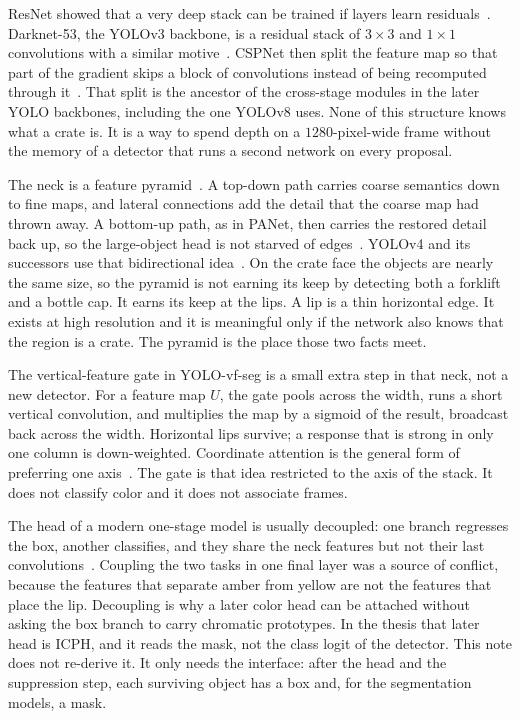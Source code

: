 \documentclass[11pt,a4paper]{article}
\begin{document}
ResNet showed that a very deep stack can be trained if layers learn residuals~\cite{he2016resnet}. Darknet-53, the YOLOv3 backbone, is a residual stack of $3\times 3$ and $1\times 1$ convolutions with a similar motive~\cite{redmon2018yolov3}. CSPNet then split the feature map so that part of the gradient skips a block of convolutions instead of being recomputed through it~\cite{wang2020cspnet}. That split is the ancestor of the cross-stage modules in the later YOLO backbones, including the one YOLOv8 uses. None of this structure knows what a crate is. It is a way to spend depth on a $1280$-pixel-wide frame without the memory of a detector that runs a second network on every proposal.

The neck is a feature pyramid~\cite{lin2017fpn}. A top-down path carries coarse semantics down to fine maps, and lateral connections add the detail that the coarse map had thrown away. A bottom-up path, as in PANet, then carries the restored detail back up, so the large-object head is not starved of edges~\cite{liu2018panet}. YOLOv4 and its successors use that bidirectional idea~\cite{bochkovskiy2020yolov4}. On the crate face the objects are nearly the same size, so the pyramid is not earning its keep by detecting both a forklift and a bottle cap. It earns its keep at the lips. A lip is a thin horizontal edge. It exists at high resolution and it is meaningful only if the network also knows that the region is a crate. The pyramid is the place those two facts meet.

The vertical-feature gate in YOLO-vf-seg is a small extra step in that neck, not a new detector. For a feature map $U$, the gate pools across the width, runs a short vertical convolution, and multiplies the map by a sigmoid of the result, broadcast back across the width. Horizontal lips survive; a response that is strong in only one column is down-weighted. Coordinate attention is the general form of preferring one axis~\cite{hou2021coordatt}. The gate is that idea restricted to the axis of the stack. It does not classify color and it does not associate frames.

The head of a modern one-stage model is usually decoupled: one branch regresses the box, another classifies, and they share the neck features but not their last convolutions~\cite{ge2021yolox}. Coupling the two tasks in one final layer was a source of conflict, because the features that separate amber from yellow are not the features that place the lip. Decoupling is why a later color head can be attached without asking the box branch to carry chromatic prototypes. In the thesis that later head is ICPH, and it reads the mask, not the class logit of the detector. This note does not re-derive it. It only needs the interface: after the head and the suppression step, each surviving object has a box and, for the segmentation models, a mask.
\end{document}
